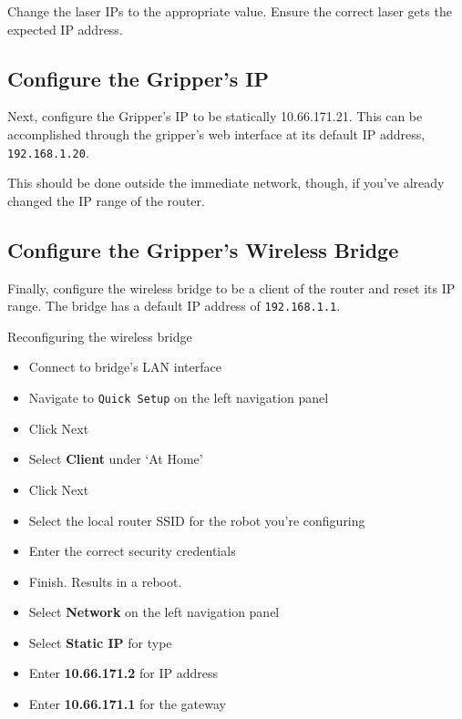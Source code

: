 Change the laser IPs to the appropriate value. 
Ensure the correct laser gets the expected IP address.

\subsection{Configure the Gripper's IP}
Next, configure the Gripper's IP to be statically 10.66.171.21. 
This can be accomplished through the gripper's web interface at its default IP address, \texttt{192.168.1.20}. 

This should be done outside the immediate network, though, if you've already changed the IP range of the router.



\subsection{Configure the Gripper's Wireless Bridge}
Finally, configure the wireless bridge to be a client of the router and reset its IP range.
The bridge has a default IP address of \texttt{192.168.1.1}.

\begin{example}{Reconfiguring the wireless bridge}
  \begin{itemize}
    \item Connect to bridge's LAN interface
    \item Navigate to \texttt{Quick Setup} on the left navigation panel
    \item Click Next
    \item Select \textbf{Client} under `At Home'
    \item Click Next
    \item Select the local router SSID for the robot you're configuring
    \item Enter the correct security credentials
    \item Finish. Results in a reboot.
    \item Select \textbf{Network} on the left navigation panel
    \item Select \textbf{Static IP} for type
    \item Enter \textbf{10.66.171.2} for IP address
    \item Enter \textbf{10.66.171.1} for the gateway
  \end{itemize}
\end{example}

